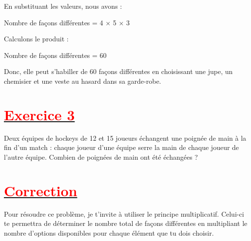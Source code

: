 \documentclass[12pt]{article}
\begin{document}
En substituant les valeurs, nous avons :

Nombre de façons différentes = 4 × 5 × 3

Calculons le produit :

Nombre de façons différentes = 60

Donc, elle peut s'habiller de 60 façons différentes en choisissant une jupe, un chemisier et une veste au hasard dans sa garde-robe.
\section*{\underline{\textbf{\textcolor{red}{Exercice 3}}}}
Deux équipes de hockeys de 12 et 15 joueurs échangent une poignée de main à la fin d’un match : chaque joueur d’une équipe serre la main de chaque joueur de l’autre équipe. Combien de poignées de main ont été échangées ?
\section*{\underline{\textbf{\textcolor{red}{Correction}}}}
Pour résoudre ce problème, je t'invite à utiliser le principe multiplicatif. Celui-ci te permettra de déterminer le nombre total de façons différentes en multipliant le nombre d'options disponibles pour chaque élément que tu dois choisir.
\end{document}
